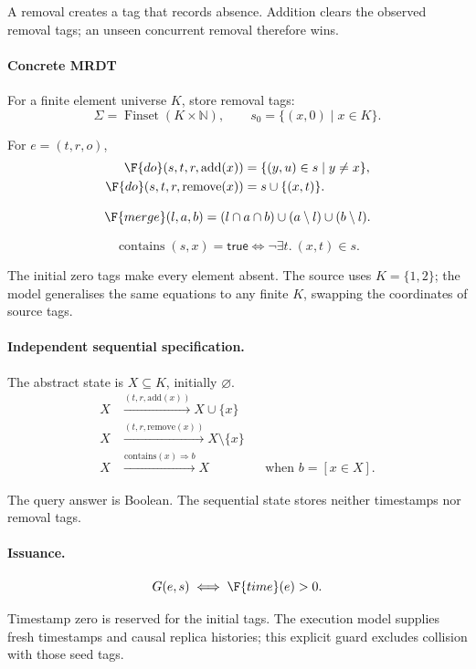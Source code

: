 A removal creates a tag that records absence. Addition clears the observed removal tags; an unseen concurrent removal therefore wins.

\paragraph{Concrete MRDT}
For a finite element universe $K$, store removal tags:
\[
\Sigma=\operatorname{Finset}(K\times\mathbb N),\qquad s_0=\{(x,0)\mid x\in K\}.
\]

For $e=(t,r,o)$,
\[
\begin{aligned}
\F{do}(s,t,r,\mathrm{add}(x))&=\{(y,u)\in s\mid y\ne x\},\\
\F{do}(s,t,r,\mathrm{remove}(x))&=s\cup\{(x,t)\}.
\end{aligned}
\]

\[
\F{merge}(l,a,b)=(l\cap a\cap b)\cup(a\setminus l)\cup(b\setminus l).
\]

\[
\operatorname{contains}(s,x)=\mathsf{true}\iff\neg\exists t.\ (x,t)\in s.
\]

The initial zero tags make every element absent. The source uses $K=\{1,2\}$; the model generalises the same equations to any finite $K$, swapping the coordinates of source tags.


\paragraph{Independent sequential specification.}
The abstract state is $X\subseteq K$, initially $\varnothing$.
\[
\begin{aligned}
X&\xrightarrow{(t,r,\mathrm{add}(x))}X\cup\{x\}\\
X&\xrightarrow{(t,r,\mathrm{remove}(x))}X\setminus\{x\}\\
X&\xrightarrow{\mathrm{contains}(x)\Rightarrow b}X&&\text{when }b=[x\in X].
\end{aligned}
\]

The query answer is Boolean. The sequential state stores neither timestamps nor removal tags.


\paragraph{Issuance.}
\[
G(e,s)\iff \F{time}(e)>0.
\]

Timestamp zero is reserved for the initial tags. The execution model supplies fresh timestamps and causal replica histories; this explicit guard excludes collision with those seed tags.


